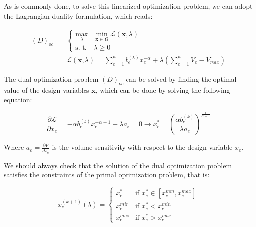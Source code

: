 As is commonly done, to solve this linearized optimization problem, we can adopt the Lagrangian duality formulation, which reads:

\begin{equation}
    \begin{aligned}
        (D)_{oc} \quad & \begin{cases}
                             \max_{\lambda} & \min_{\bm{x} \in \Omega} \mathcal{L}(\bm{x}, \lambda) \\
                             \text{s. t.}   & \lambda \geq 0
                         \end{cases}                                      \\
                       & \mathcal{L}(\bm{x}, \lambda) = \sum_{e=1}^{n} b_e^{(k)} x_e^{-\alpha} + \lambda \left( \sum_{e=1}^{n} V_e - V_{max} \right)
    \end{aligned}
    \label{eq:oc_dual_optimization_problem}
\end{equation}

The dual optimization problem $(D)_{oc}$ can be solved by finding the optimal value of the design variables $\bm{x}$, which can be done by solving the following equation:

\begin{equation}
    \frac{\partial \mathcal{L}}{\partial x_e} = -\alpha b_e^{(k)} x_e^{-\alpha - 1} + \lambda a_e = 0 \rightarrow x_e^* = \left( \frac{\alpha b_e^{(k)}}{\lambda a_e} \right)^{\frac{1}{\alpha + 1}}
    \label{eq:oc_dual_optimization_solution}
\end{equation}

Where $a_e = \frac{\partial V}{\partial x_e}$ is the volume sensitivity with respect to the design variable $x_e$.

We should always check that the solution of the dual optimization problem satisfies the constraints of the primal optimization problem, that is:

\begin{equation}
    x_e^{(k+1)}(\lambda) = \begin{cases}
        x_e^*     & \text{if } x_e^* \in [x_e^{min}, x_e^{max}] \\
        x_e^{min} & \text{if } x_e^* < x_e^{min}                \\
        x_e^{max} & \text{if } x_e^* > x_e^{max}
    \end{cases}
    \label{eq:oc_dual_optimization_projection}
\end{equation}

